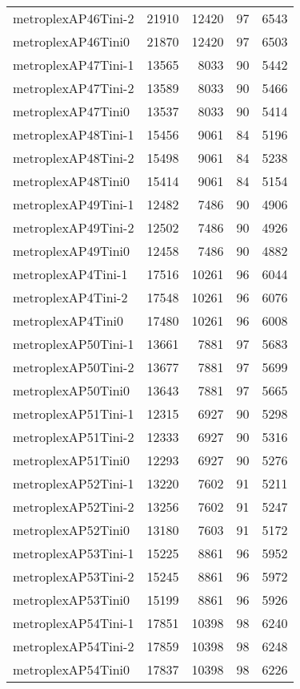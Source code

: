 \begin{longtable}{lrrrr}
metroplexAP46Tini-2 & 21910 & 12420 & 97 & 6543 \\
metroplexAP46Tini0 & 21870 & 12420 & 97 & 6503 \\
metroplexAP47Tini-1 & 13565 & 8033 & 90 & 5442 \\
metroplexAP47Tini-2 & 13589 & 8033 & 90 & 5466 \\
metroplexAP47Tini0 & 13537 & 8033 & 90 & 5414 \\
metroplexAP48Tini-1 & 15456 & 9061 & 84 & 5196 \\
metroplexAP48Tini-2 & 15498 & 9061 & 84 & 5238 \\
metroplexAP48Tini0 & 15414 & 9061 & 84 & 5154 \\
metroplexAP49Tini-1 & 12482 & 7486 & 90 & 4906 \\
metroplexAP49Tini-2 & 12502 & 7486 & 90 & 4926 \\
metroplexAP49Tini0 & 12458 & 7486 & 90 & 4882 \\
metroplexAP4Tini-1 & 17516 & 10261 & 96 & 6044 \\
metroplexAP4Tini-2 & 17548 & 10261 & 96 & 6076 \\
metroplexAP4Tini0 & 17480 & 10261 & 96 & 6008 \\
metroplexAP50Tini-1 & 13661 & 7881 & 97 & 5683 \\
metroplexAP50Tini-2 & 13677 & 7881 & 97 & 5699 \\
metroplexAP50Tini0 & 13643 & 7881 & 97 & 5665 \\
metroplexAP51Tini-1 & 12315 & 6927 & 90 & 5298 \\
metroplexAP51Tini-2 & 12333 & 6927 & 90 & 5316 \\
metroplexAP51Tini0 & 12293 & 6927 & 90 & 5276 \\
metroplexAP52Tini-1 & 13220 & 7602 & 91 & 5211 \\
metroplexAP52Tini-2 & 13256 & 7602 & 91 & 5247 \\
metroplexAP52Tini0 & 13180 & 7603 & 91 & 5172 \\
metroplexAP53Tini-1 & 15225 & 8861 & 96 & 5952 \\
metroplexAP53Tini-2 & 15245 & 8861 & 96 & 5972 \\
metroplexAP53Tini0 & 15199 & 8861 & 96 & 5926 \\
metroplexAP54Tini-1 & 17851 & 10398 & 98 & 6240 \\
metroplexAP54Tini-2 & 17859 & 10398 & 98 & 6248 \\
metroplexAP54Tini0 & 17837 & 10398 & 98 & 6226 \\

\end{longtable}
